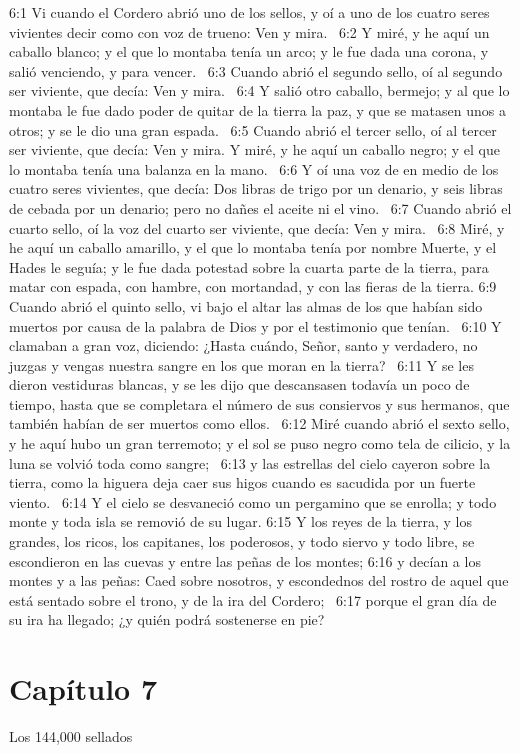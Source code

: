 6:1 Vi cuando el Cordero abrió uno de los sellos, y oí a uno de los cuatro seres vivientes decir como con voz de trueno: Ven y mira.  
6:2 Y miré, y he aquí un caballo blanco; y el que lo montaba tenía un arco; y le fue dada una corona, y salió venciendo, y para vencer.  
6:3 Cuando abrió el segundo sello, oí al segundo ser viviente, que decía: Ven y mira.  
6:4 Y salió otro caballo, bermejo; y al que lo montaba le fue dado poder de quitar de la tierra la paz, y que se matasen unos a otros; y se le dio una gran espada.  
6:5 Cuando abrió el tercer sello, oí al tercer ser viviente, que decía: Ven y mira. Y miré, y he aquí un caballo negro; y el que lo montaba tenía una balanza en la mano.  
6:6 Y oí una voz de en medio de los cuatro seres vivientes, que decía: Dos libras de trigo por un denario, y seis libras de cebada por un denario; pero no dañes el aceite ni el vino.  
6:7 Cuando abrió el cuarto sello, oí la voz del cuarto ser viviente, que decía: Ven y mira.  
6:8 Miré, y he aquí un caballo amarillo, y el que lo montaba tenía por nombre Muerte, y el Hades le seguía; y le fue dada potestad sobre la cuarta parte de la tierra, para matar con espada, con hambre, con mortandad, y con las fieras de la tierra. 
6:9 Cuando abrió el quinto sello, vi bajo el altar las almas de los que habían sido muertos por causa de la palabra de Dios y por el testimonio que tenían.  
6:10 Y clamaban a gran voz, diciendo: ¿Hasta cuándo, Señor, santo y verdadero, no juzgas y vengas nuestra sangre en los que moran en la tierra?  
6:11 Y se les dieron vestiduras blancas, y se les dijo que descansasen todavía un poco de tiempo, hasta que se completara el número de sus consiervos y sus hermanos, que también habían de ser muertos como ellos.  
6:12 Miré cuando abrió el sexto sello, y he aquí hubo un gran terremoto; y el sol se puso negro como tela de cilicio, y la luna se volvió toda como sangre;  
6:13 y las estrellas del cielo cayeron sobre la tierra, como la higuera deja caer sus higos cuando es sacudida por un fuerte viento.  
6:14 Y el cielo se desvaneció como un pergamino que se enrolla; y todo monte y toda isla se removió de su lugar. 
6:15 Y los reyes de la tierra, y los grandes, los ricos, los capitanes, los poderosos, y todo siervo y todo libre, se escondieron en las cuevas y entre las peñas de los montes; 
6:16 y decían a los montes y a las peñas: Caed sobre nosotros, y escondednos del rostro de aquel que está sentado sobre el trono, y de la ira del Cordero;  
6:17 porque el gran día de su ira ha llegado; ¿y quién podrá sostenerse en pie? 
\section*{Capítulo 7}
Los 144,000 sellados  

